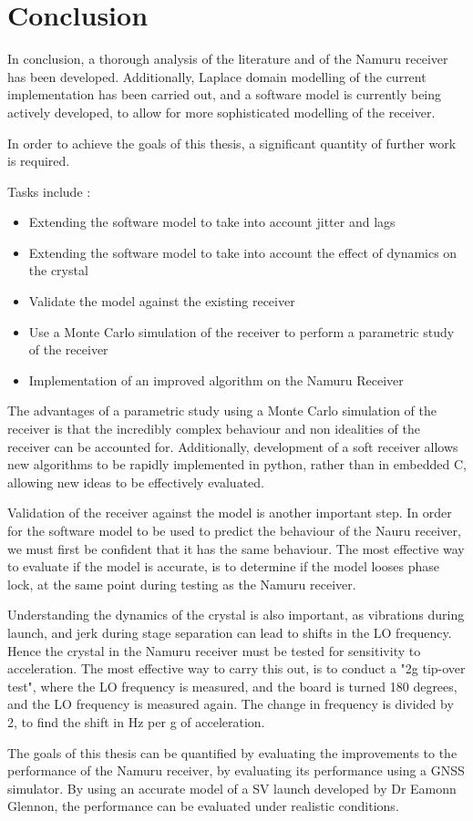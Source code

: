 \chapter{Conclusion}\label{ch:conclusion}

In conclusion, a thorough analysis of the literature and of the Namuru receiver has been developed. Additionally, Laplace domain modelling of the current implementation has been carried out, and a software model is currently being actively developed, to allow for more sophisticated modelling of the receiver. 

In order to achieve the goals of this thesis, a significant quantity of further work is required. 

Tasks include : 
\begin{itemize}
\item{Extending the software model to take into account jitter and lags}
\item{Extending the software model to take into account the effect of dynamics on the crystal}
\item{Validate the model against the existing receiver}
\item{Use a Monte Carlo simulation of the receiver to perform a parametric study of the receiver}
\item{Implementation of an improved algorithm on the Namuru Receiver}
\end{itemize}

The advantages of a parametric study using a Monte Carlo simulation of the receiver is that the incredibly complex behaviour and non idealities of the receiver can be accounted for. Additionally, development of a soft receiver allows new algorithms to be rapidly implemented in python, rather than in embedded C, allowing new ideas to be effectively evaluated. 

Validation of the receiver against the model is another important step. In order for the software model to be used to predict the behaviour of the Nauru receiver, we must first be confident that it has the same behaviour. The most effective way to evaluate if the model is accurate, is to determine if the model looses phase lock, at the same point during testing as the Namuru receiver. 

Understanding the dynamics of the crystal is also important, as vibrations during launch, and jerk during stage separation can lead to shifts in the \ac{LO} frequency. Hence the crystal in the Namuru receiver must be tested for sensitivity to acceleration. The most effective way to carry this out, is to conduct a "2g tip-over test", where the \ac{LO} frequency is measured, and the board is turned 180 degrees, and the \ac{LO} frequency is measured again. The change in frequency is divided by 2, to find the shift in Hz per g of acceleration. 


The goals of this thesis can be quantified by evaluating the improvements to the performance of the Namuru receiver, by evaluating its performance using a \ac{GNSS} simulator. By using an accurate model of a \ac{SV} launch developed by Dr Eamonn Glennon, the performance can be evaluated under realistic conditions.




